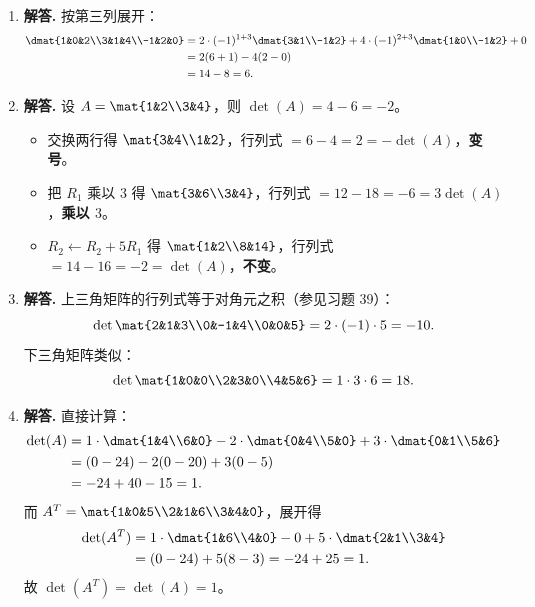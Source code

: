 \begin{enumerate}[label=\textbf{\arabic*.}, leftmargin=*, itemsep=1em]
  \item \textbf{解答.}
  按第三列展开：
  \begin{align*}
    \dmat{1&0&2\\3&1&4\\-1&2&0}
    &= 2\cdot(-1)^{1+3}\dmat{3&1\\-1&2}
      +4\cdot(-1)^{2+3}\dmat{1&0\\-1&2}
      +0 \\
    &= 2(6+1) - 4(2-0) \\
    &= 14 - 8 = 6.
  \end{align*}

  \item \textbf{解答.}
  设 $A=\mat{1&2\\3&4}$，则 $\det(A)=4-6=-2$。
  \begin{itemize}
    \item 交换两行得 $\mat{3&4\\1&2}$，行列式 $=6-4=2=-\det(A)$，\textbf{变号}。
    \item 把 $R_1$ 乘以 $3$ 得 $\mat{3&6\\3&4}$，行列式 $=12-18=-6=3\det(A)$，\textbf{乘以 $3$}。
    \item $R_2\leftarrow R_2+5R_1$ 得 $\mat{1&2\\8&14}$，行列式 $=14-16=-2=\det(A)$，\textbf{不变}。
  \end{itemize}

  \item \textbf{解答.}
  上三角矩阵的行列式等于对角元之积（参见习题 39）：
  \[
    \det\mat{2&1&3\\0&-1&4\\0&0&5} = 2\cdot(-1)\cdot5 = -10.
  \]
  下三角矩阵类似：
  \[
    \det\mat{1&0&0\\2&3&0\\4&5&6} = 1\cdot3\cdot6 = 18.
  \]

  \item \textbf{解答.}
  直接计算：
  \begin{align*}
    \det(A)
    &= 1\cdot\dmat{1&4\\6&0} - 2\cdot\dmat{0&4\\5&0} + 3\cdot\dmat{0&1\\5&6} \\
    &= (0-24) - 2(0-20) + 3(0-5) \\
    &= -24+40-15 = 1.
  \end{align*}
  而 $A^T=\mat{1&0&5\\2&1&6\\3&4&0}$，展开得
  \begin{align*}
    \det(A^T)
    &= 1\cdot\dmat{1&6\\4&0} - 0 + 5\cdot\dmat{2&1\\3&4} \\
    &= (0-24)+5(8-3) = -24+25 = 1.
  \end{align*}
  故 $\det(A^T)=\det(A)=1$。


\end{enumerate}
